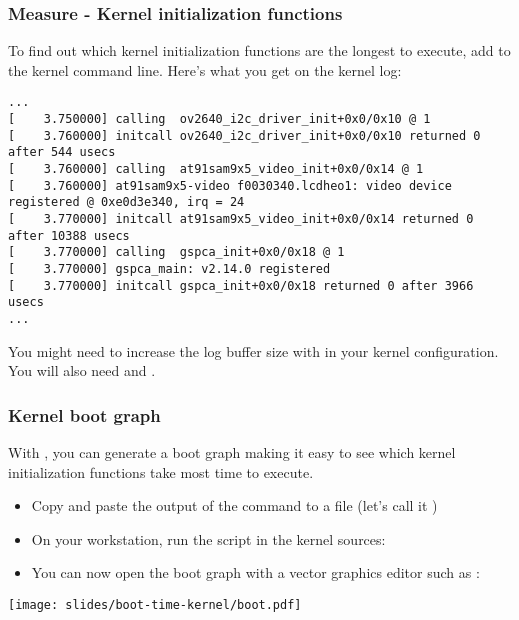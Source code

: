 \begin{frame}[fragile]
\frametitle{Measure - Kernel initialization functions}
To find out which kernel initialization functions are the longest to
execute, add  to the kernel command line.
Here's what you get on the kernel log:
\begin{block}{}
\tiny
\begin{verbatim}
...
[    3.750000] calling  ov2640_i2c_driver_init+0x0/0x10 @ 1
[    3.760000] initcall ov2640_i2c_driver_init+0x0/0x10 returned 0 after 544 usecs
[    3.760000] calling  at91sam9x5_video_init+0x0/0x14 @ 1
[    3.760000] at91sam9x5-video f0030340.lcdheo1: video device registered @ 0xe0d3e340, irq = 24
[    3.770000] initcall at91sam9x5_video_init+0x0/0x14 returned 0 after 10388 usecs
[    3.770000] calling  gspca_init+0x0/0x18 @ 1
[    3.770000] gspca_main: v2.14.0 registered
[    3.770000] initcall gspca_init+0x0/0x18 returned 0 after 3966 usecs
...
\end{verbatim}
\end{block}
You might need to increase the log buffer size with
 in your kernel configuration. You will
also need  and .
\end{frame}

\begin{frame}
\frametitle{Kernel boot graph}
With , you can generate a boot graph
making it easy to see which kernel initialization functions
take most time to execute.
\begin{itemize}
\item Copy and paste the output of
      the  command to a file (let's call it )
\item On your workstation, run the  script
      in the kernel sources: \\
\item You can now open the boot graph with a vector graphics
      editor such as :
\end{itemize}
\begin{center}
    \texttt{[image: slides/boot-time-kernel/boot.pdf]}
\end{center}
\end{frame}

